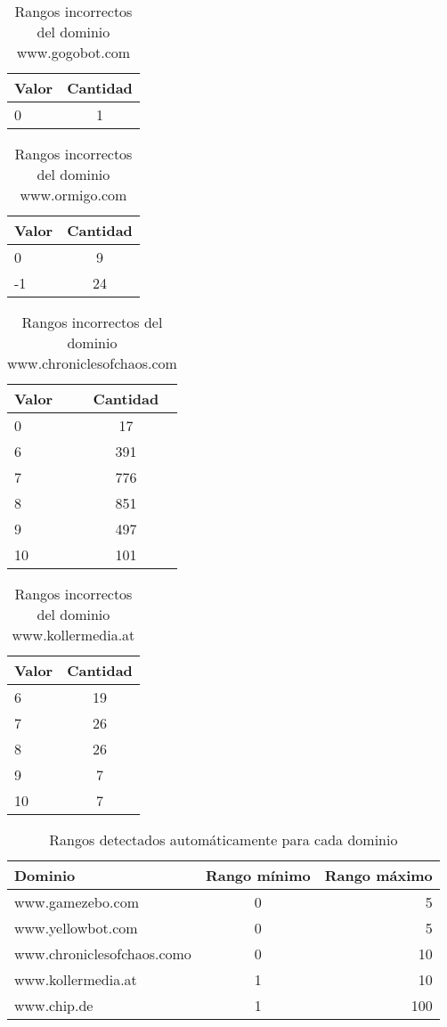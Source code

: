 \begin{table}[h]
\begin{tabular}{| l | c |}\hline
 Valor & Cantidad\\\hline
 0 & 1\\\hline
\end{tabular}
\caption{Rangos incorrectos del dominio www.gogobot.com}
\label{table:Gogobot}
\end{table}

\begin{table}[h]
\begin{tabular}{| l | c |}\hline
 Valor & Cantidad\\\hline
 0 & 9\\
 -1 & 24\\\hline
\end{tabular}
\caption{Rangos incorrectos del dominio www.ormigo.com}
\label{table:Ormigo}
\end{table}

\begin{table}[h]
\begin{tabular}{| l | c |}\hline
 Valor & Cantidad\\\hline
 0 & 17\\
 6 & 391\\
 7 & 776\\
 8 & 851\\
 9 & 497\\
 10 & 101\\\hline
\end{tabular}
\caption{Rangos incorrectos del dominio www.chroniclesofchaos.com}
\label{table:Chronic}
\end{table}

\begin{table}[h]
\begin{tabular}{| l | c |}\hline
 Valor & Cantidad\\\hline
 6 & 19\\
 7 & 26\\
 8 & 26\\
 9 & 7\\
 10 & 7\\\hline
\end{tabular}
\caption{Rangos incorrectos del dominio www.kollermedia.at}
\label{table:Kollermedia}
\end{table}

\begin{table}[h]
\begin{tabular}{| l | c | r | }\hline
 Dominio & Rango mínimo & Rango máximo \\\hline
 www.gamezebo.com & 0 & 5 \\
 www.yellowbot.com & 0 & 5 \\
 www.chroniclesofchaos.como & 0 & 10 \\
 www.kollermedia.at & 1 & 10 \\
 www.chip.de & 1 & 100 \\\hline
\end{tabular}
\caption{Rangos detectados automáticamente para cada dominio}
\label{table:DetectedRanges}
\end{table}

